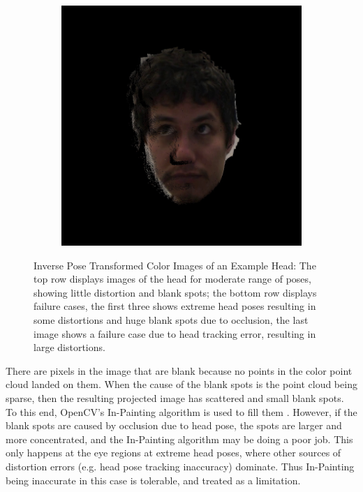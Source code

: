 \begin{figure}[h]
\begin{subfigure}[b]{0.24\textwidth}
	\end{subfigure}
	\begin{subfigure}[b]{0.24\textwidth}
		\includegraphics[width=1.1\linewidth]{./img/eyeimages/trackingError.jpg}
	\end{subfigure}
	\caption{Inverse Pose Transformed Color Images of an Example Head: The top row displays images of the head for moderate range of poses, showing little distortion and blank spots; the bottom row displays failure cases, the first three shows extreme head poses resulting in some distortions and huge blank spots due to occlusion, the last image shows a failure case due to head tracking error, resulting in large distortions.}
	\label{fig:inversePoseResults}
\end{figure}


There are pixels in the image that are blank because no points in the color point cloud landed on them.  When the cause of the blank spots is the point cloud being sparse, then the resulting projected image has scattered and small blank spots.  To this end, OpenCV's In-Painting algorithm is used to fill them \cite{bertalmio2000image}.  However, if the blank spots are caused by occlusion due to head pose, the spots are larger and more concentrated, and the In-Painting algorithm may be doing a poor job.  This only happens at the eye regions at extreme head poses, where other sources of distortion errors (e.g. head pose tracking inaccuracy) dominate.  Thus In-Painting being inaccurate in this case is tolerable, and treated as a limitation.

